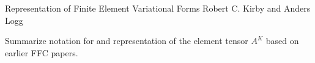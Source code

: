               {Representation of Finite Element Variational Forms}
              {Robert C. Kirby and Anders Logg}

\editornote{[kirby-5]}

Summarize notation for and representation of the element tensor $A^K$
based on earlier FFC papers.
